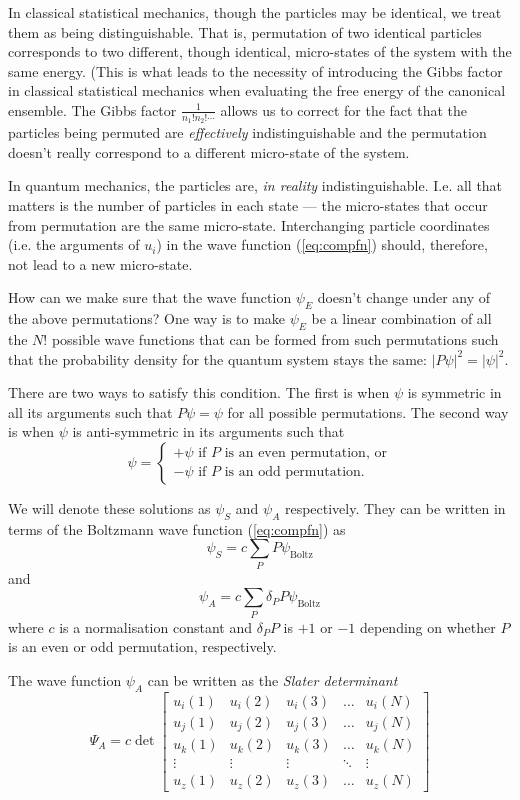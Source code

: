 In classical statistical mechanics, though the particles may be identical, we treat them as being distinguishable. That is, permutation of two identical particles corresponds to two different, though identical, micro-states of the system with the same energy. (This is what leads to the necessity of introducing the Gibbs factor in classical statistical mechanics when evaluating the free energy of the canonical ensemble.  The Gibbs factor $\frac{1}{n_1!n_2!\cdots}$ allows us to correct for the fact that the particles being permuted are \emph{effectively} indistinguishable and the permutation doesn't really correspond to a different micro-state of the system.

In quantum mechanics, the particles are, \emph{in reality} indistinguishable. I.e. all that matters is the number of particles in each state --- the micro-states that occur from permutation are the same micro-state.
Interchanging particle coordinates (i.e. the arguments of $u_i$) in the wave function (\ref{eq:compfn}) should, therefore, not lead to a new micro-state.

How can we make sure that the wave function $\psi_E$ doesn't change under any of the above permutations? One way is to make $\psi_E$ be a linear combination of all the $N!$ possible wave functions that can be formed from such permutations such that the probability density for the quantum system stays the same: $|P\psi|^2=|\psi|^2$.

There are two ways to satisfy this condition. The first is when $\psi$ is symmetric in all its arguments such that $P\psi = \psi$ for all possible permutations. The second way is when $\psi$ is anti-symmetric in its arguments such that
$$
	\psi = 
	\begin{cases}
		+\psi \text{ if $P$ is an even permutation, or}\\
		-\psi \text{ if $P$ is an odd permutation.}
	\end{cases}
$$

We will denote these solutions as $\psi_S$ and $\psi_A$ respectively. They can be written in terms of the Boltzmann wave function (\ref{eq:compfn}) as
$$
	\psi_S=c\sum_P P\psi_\text{Boltz}
$$
and
$$
	\psi_A=c\sum_P \delta_PP\psi_\text{Boltz}
$$
where $c$ is a normalisation constant and $\delta_PP$ is $+1$ or $-1$ depending on whether $P$ is an even or odd permutation, respectively.

The wave function $\psi_A$ can be written as the \emph{Slater determinant} 
$$
	\Psi_A = c\det\begin{bmatrix}
		u_i(1) & u_i(2) & u_i(3) & \dots & u_i(N)\\
		u_j(1) & u_j(2) & u_j(3) & \dots & u_j(N)\\
		u_k(1) & u_k(2) & u_k(3) & \dots & u_k(N)\\
		\vdots & \vdots & \vdots & \ddots & \vdots \\
		u_z(1) & u_z(2) & u_z(3) & \dots & u_z(N)
	\end{bmatrix}
$$

